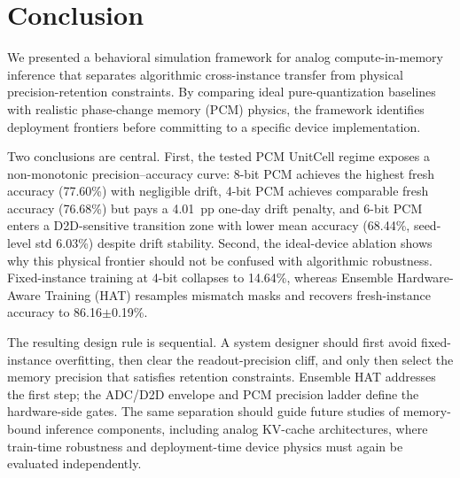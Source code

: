 \section{Conclusion}
\label{sec:conclusion}

We presented a behavioral simulation framework for analog compute-in-memory inference that separates algorithmic cross-instance transfer from physical precision-retention constraints. By comparing ideal pure-quantization baselines with realistic phase-change memory (PCM) physics, the framework identifies deployment frontiers before committing to a specific device implementation.

Two conclusions are central. First, the tested PCM UnitCell regime exposes a non-monotonic precision--accuracy curve: 8-bit PCM achieves the highest fresh accuracy (77.60\%) with negligible drift, 4-bit PCM achieves comparable fresh accuracy (76.68\%) but pays a 4.01~pp one-day drift penalty, and 6-bit PCM enters a D2D-sensitive transition zone with lower mean accuracy (68.44\%, seed-level std 6.03\%) despite drift stability. Second, the ideal-device ablation shows why this physical frontier should not be confused with algorithmic robustness. Fixed-instance training at 4-bit collapses to 14.64\%, whereas Ensemble Hardware-Aware Training (HAT) resamples mismatch masks and recovers fresh-instance accuracy to 86.16$\pm$0.19\%.

The resulting design rule is sequential. A system designer should first avoid fixed-instance overfitting, then clear the readout-precision cliff, and only then select the memory precision that satisfies retention constraints. Ensemble HAT addresses the first step; the ADC/D2D envelope and PCM precision ladder define the hardware-side gates. The same separation should guide future studies of memory-bound inference components, including analog KV-cache architectures, where train-time robustness and deployment-time device physics must again be evaluated independently.
